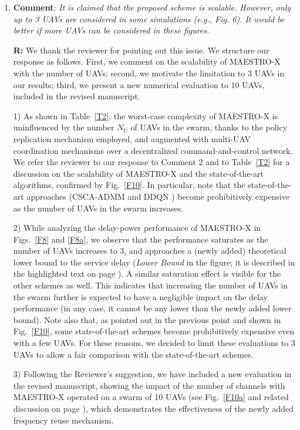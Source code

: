 \documentclass[12pt, draftcls, onecolumn]{IEEEtran}
\theoremstyle{plain}
\theoremstyle{definition}
\theoremstyle{remark}
\begin{document}
\begin{enumerate}
\item \textbf{Comment}: \emph{It is claimed that the proposed scheme is scalable. However, only up to 3 UAVs are considered in some simulations (e.g., Fig. 6). It would be better if more UAVs can be considered in these figures.}
\vspace{2mm}

\textbf{R:} We thank the reviewer for pointing out this issue.
We structure our response as follows. First, we comment on the scalability of MAESTRO-X with the number of UAVs; second, we motivate the limitation to 3 UAVs in our results;
third, we present a new numerical evaluation to 10 UAVs, included in the revised manuscript.
\vspace{2mm}

1) As shown in Table~\ref{T2}, the worst-case complexity of MAESTRO-X is uninfluenced by the number $N_U$ of UAVs in the swarm, thanks to the policy replication mechanism employed, and augmented with multi-UAV coordination mechanisms over a decentralized command-and-control network. We refer the reviewer to our response to Comment 2 and to Table~\ref{T2} for a discussion on the scalability of MAESTRO-X and the state-of-the-art algorithms, confirmed by 
 Fig.~\ref{F10}.
 In particular, note that the state-of-the-art approaches (CSCA-ADMM \cite{CSCA-ADMM} and DDQN \cite{DDQN}) become prohibitively expensive as the number of UAVs in the swarm increases.
\vspace{2mm}

2) While analyzing the delay-power performance of MAESTRO-X in Figs.~\ref{F8} and \ref{F8a}, we observe that the performance saturates as the number of UAVs increases to 3, and approaches a (newly added) theoretical lower bound to the service  delay (\emph{Lower Bound} in the figure; it is described in the highlighted text on page \pageref{LB}).
A similar saturation effect is visible for the other schemes as well.
This indicates that  increasing the number of UAVs in the swarm further is expected to have a negligible impact on the delay performance (in any case, it cannot be any lower than the newly added lower bound).
Note also that, as pointed out in the previous point and shown in Fig.~\ref{F10}, some state-of-the-art schemes become prohibitively expensive even with a few UAVs. For these reasons, we decided to limit these evaluations to 3 UAVs to allow a fair comparison with the state-of-the-art schemes.
\vspace{2mm}

3) Following the Reviewer's suggestion, we have included a new evaluation in the revised manuscript, showing the impact of the number of channels with MAESTRO-X operated on a swarm of 10 UAVs (see Fig.~\ref{F10a} and related discussion on page \pageref{F10a}),
which demonstrates the effectiveness of the newly added frequency reuse mechanism.
\vspace{4mm}


\end{enumerate}
\end{document}
